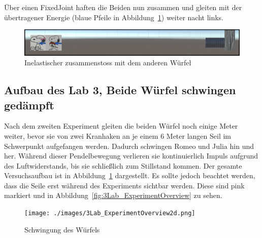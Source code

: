 \documentclass[../main.tex]{subfiles}
\begin{document}
\begin{enumerate}
     Über einen FixedJoint haften die Beiden nun zusammen und gleiten mit der übertragener Energie
     (blaue Pfeile in Abbildung~\ref{fig:2Lab_2dPictureNr3}) weiter nacht links.
     \begin{figure}[H]
                \begin{center}
                    \centerline{\includegraphics[width=155mm]{./images/2Lab_2dPictureNr3.png}}
                    \caption{Inelastischer zusammenstoss mit dem anderen Würfel}
                    \label{fig:2Lab_2dPictureNr3}
                \end{center}
     \end{figure}
 \end{enumerate}

    \subsection{Aufbau des Lab 3, \glqq Beide Würfel schwingen gedämpft\grqq{}}
    Nach dem zweiten Experiment gleiten die beiden Würfel noch einige Meter weiter,
    bevor sie von zwei Kranhaken an je einem 6 Meter langen Seil im Schwerpunkt aufgefangen werden.
    Dadurch schwingen Romeo und Julia hin und her. Während dieser Pendelbewegung verlieren sie
    kontinuierlich Impuls aufgrund des Luftwiderstands, bis sie schließlich zum Stillstand kommen.
    \newline
    Der gesamte Versuchsaufbau ist in Abbildung~\ref{fig:2Lab_2dPictureNr3} dargestellt.
    Es sollte jedoch beachtet werden, dass die Seile erst während des Experiments sichtbar
    werden. Diese sind pink markiert und in Abbildung~\ref{fig:3Lab_ExperimentOverview} zu sehen.
    \begin{figure}[H]
        \begin{center}
            \centerline{\texttt{[image: ./images/3Lab\_ExperimentOverview2d.png]}}
            \caption{Schwingung des Würfels}
            \label{fig:3Lab_ExperimentOverview2d}
        \end{center}
    \end{figure}
\end{document}
